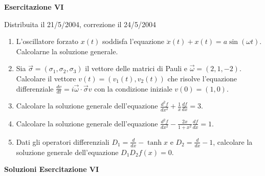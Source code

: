 \documentclass[a4paper,10pt]{article}
\begin{document}
\newpage


\centerline{\LARGE \bf Esercitazione VI}
\centerline{Distribuita il 21/5/2004, correzione il 24/5/2004}
\vskip10pt

\begin{enumerate}
\item L'oscillatore forzato $x(t)$ soddisfa l'equazione $\ddot x (t)
+ x(t) = a \sin (\omega t)$. Calcolarne la soluzione generale.
\item Sia $\vec{\sigma} = (\sigma_1,\sigma_2,\sigma_3)$ il vettore delle
matrici di Pauli e $\vec{\omega}=(2,1,-2)$. Calcolare il vettore 
$v(t)= ( v_1(t),v_2(t))$ che risolve l'equazione differenziale 
$\frac{dv}{dt} = i \vec\omega \cdot \vec\sigma v$ con la condizione iniziale
$v(0)=(1,0)$.
\item Calcolare la soluzione generale dell'equazione $\frac{d^2f}{dx^2}
+ \frac{1}{x}\frac{df}{dx} = 3$.
\item Calcolare la soluzione generale dell'equazione $\frac{d^2f}{dx^2}
- \frac{2x}{1+x^2} \frac{df}{dx} = 1$.
\item Dati gli operatori differenziali $D_1 = \frac{d}{dx} - \tanh x$ e
$D_2 = \frac{d}{dx} - 1$, calcolare la soluzione generale dell'equazione
$D_1 D_2 f(x) = 0$.
\end{enumerate}

\vskip20pt

\centerline{\LARGE \bf Soluzioni Esercitazione VI}
\vskip10pt
\end{document}
